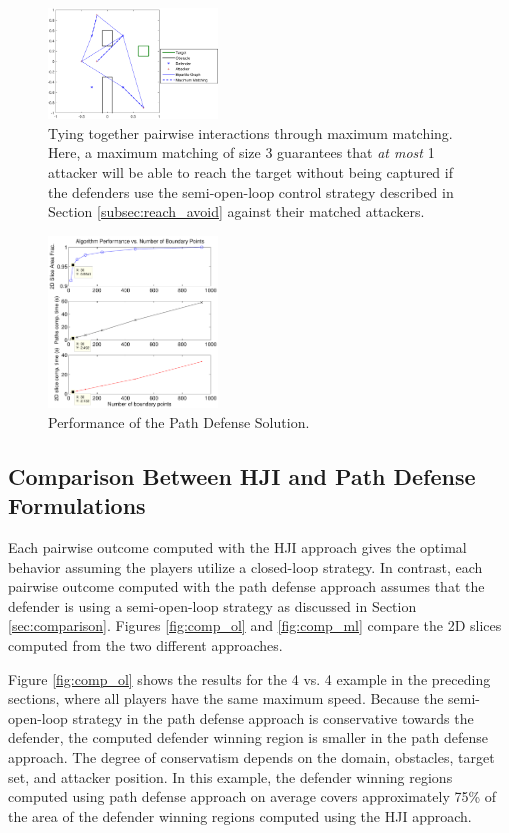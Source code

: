 \begin{figure}
	\centering
	\includegraphics[width=0.4\textwidth]{"fig/OLGame_mm_results_PD"}
	\caption{Tying together pairwise interactions through maximum matching. Here, a maximum matching of size 3 guarantees that \textit{at most} 1 attacker will be able to reach the target without being captured if the defenders use the semi-open-loop control strategy described in Section \ref{subsec:reach_avoid} against their matched attackers.}
	\label{fig:pd_mm}
\end{figure}

\begin{figure}
	\centering
	\includegraphics[width=0.4\textwidth]{"fig/alg_perf_Rc"}
	\caption{Performance of the Path Defense Solution.}
	\label{fig:pd_perf}
\end{figure}

\subsection{Comparison Between HJI and Path Defense Formulations}
Each pairwise outcome computed with the HJI approach gives the optimal behavior assuming the players utilize a closed-loop strategy. In contrast, each pairwise outcome computed with the path defense approach assumes that the defender is using a semi-open-loop strategy as discussed in Section \ref{sec:comparison}. Figures \ref{fig:comp_ol} and \ref{fig:comp_ml} compare the 2D slices computed from the two different approaches.

Figure \ref{fig:comp_ol} shows the results for the 4 vs. 4 example in the preceding sections, where all players have the same maximum speed. Because the semi-open-loop strategy in the path defense approach is conservative towards the defender, the computed defender winning region is smaller in the path defense approach. The degree of conservatism depends on the domain, obstacles, target set, and attacker position. In this example, the defender winning regions computed using path defense approach on average covers approximately 75\% of the area of the defender winning regions computed using the HJI approach.


